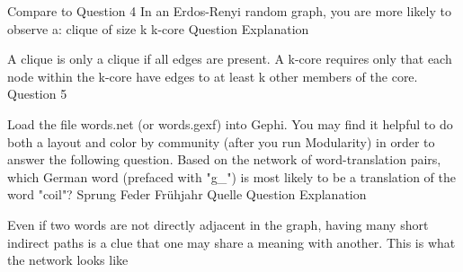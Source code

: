 Compare  to 
Question 4
In an Erdos-Renyi random graph, you are more likely to observe a:
clique of size k
k-core
Question Explanation

A clique is only a clique if all edges are present. A k-core requires only that each node within the k-core have edges to at least k other members of the core.
Question 5

Load the file words.net (or words.gexf) into Gephi. You may find it helpful to do both a layout and color by community (after you run Modularity) in order to answer the following question. Based on the network of word-translation pairs, which German word (prefaced with "g_") is most likely to be a translation of the word "coil"?
Sprung
Feder
Frühjahr
Quelle
Question Explanation

Even if two words are not directly adjacent in the graph, having many short indirect paths is a clue that one may share a meaning with another. This is what the network looks like
